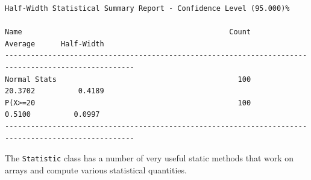 \documentclass[
]{book}
\theoremstyle{definition}
\theoremstyle{definition}
\theoremstyle{definition}
\theoremstyle{definition}
\theoremstyle{remark}
\begin{document}
\begin{verbatim}
Half-Width Statistical Summary Report - Confidence Level (95.000)% 

Name                                                Count         Average      Half-Width 
---------------------------------------------------------------------------------------------------- 
Normal Stats                                          100         20.3702          0.4189 
P(X>=20                                               100          0.5100          0.0997 
---------------------------------------------------------------------------------------------------- 
\end{verbatim}

The \texttt{Statistic} class has a number of very useful static methods that work on arrays and compute various statistical quantities.
\end{document}
